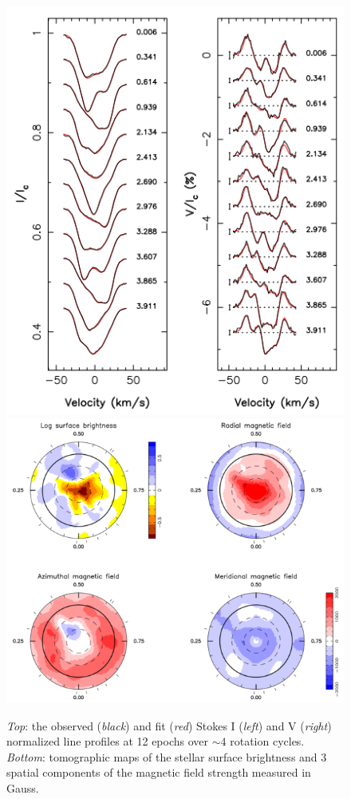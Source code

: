 \begin{figure}
\centering
\includegraphics[scale=.5]{figures/stokes.png}
\includegraphics[scale=.5]{figures/tomographicmaps.png}
\caption{\emph{Top}: the observed (\emph{black}) and fit (\emph{red}) Stokes I (\emph{left}) 
and V (\emph{right}) normalized line profiles at 12 epochs over $\sim 4$ rotation cycles. 
\emph{Bottom}: tomographic maps of the stellar surface brightness and 3 spatial components of 
the magnetic field strength measured in Gauss. 
\parencite[Image credit:][]{donati14b} \label{fig:stokes}}
\end{figure}


